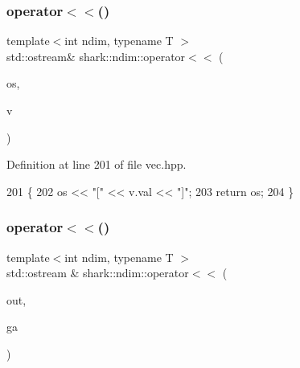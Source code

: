 \hypertarget{namespaceshark_1_1ndim_ac25a04011fd3ab5350dc899a9359db49}{}\label{namespaceshark_1_1ndim_ac25a04011fd3ab5350dc899a9359db49} 
\subsubsection{\texorpdfstring{operator$<$$<$()}{operator<<()}\hspace{0.1cm}{\footnotesize\ttfamily [4/5]}}
{\footnotesize\ttfamily template$<$int ndim, typename T $>$ \\
std\+::ostream\& shark\+::ndim\+::operator$<$$<$ (\begin{DoxyParamCaption}\item[{std\+::ostream \&}]{os,  }\item[{const \hyperlink{structshark_1_1ndim_1_1vec}{vec}$<$ ndim, T $>$ \&}]{v }\end{DoxyParamCaption})\hspace{0.3cm}{\ttfamily [inline]}}



Definition at line 201 of file vec.\+hpp.


\begin{DoxyCode}
201                                                                               \{
202                         os << \textcolor{stringliteral}{"["} << v.val << \textcolor{stringliteral}{"]"};
203             \textcolor{keywordflow}{return} os;
204         \}
\end{DoxyCode}
\hypertarget{namespaceshark_1_1ndim_a26bc600679af01d20abfd2d8a986e91e}{}\label{namespaceshark_1_1ndim_a26bc600679af01d20abfd2d8a986e91e} 
\subsubsection{\texorpdfstring{operator$<$$<$()}{operator<<()}\hspace{0.1cm}{\footnotesize\ttfamily [5/5]}}
{\footnotesize\ttfamily template$<$int ndim, typename T $>$ \\
std\+::ostream \& shark\+::ndim\+::operator$<$$<$ (\begin{DoxyParamCaption}\item[{std\+::ostream \&}]{out,  }\item[{const \hyperlink{classshark_1_1ndim_1_1_global_array}{Global\+Array}$<$ ndim, T $>$ \&}]{ga }\end{DoxyParamCaption})}



